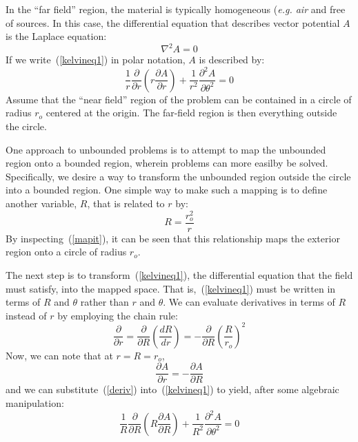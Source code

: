 \documentclass[12pt]{report}
\begin{document}
In the ``far field'' region, the material is typically homogeneous
({\em e.g. air} and free of sources.  In this case, the
differential equation that describes vector potential $A$ is the
Laplace equation:
\begin{equation} \label{kelvineq1}
\nabla^2 A = 0
\end{equation}
If we write~(\ref{kelvineq1}) in polar notation, $A$ is described by:
\begin{equation}
\frac{1}{r} \frac{\partial}{\partial r} \left( r \frac{\partial
A}{\partial r} \right) + \frac{1}{r^2} \frac{\partial^2 A}{\partial
\theta^2} = 0
\end{equation}
Assume that the ``near field'' region of the problem can be
contained in a circle of radius $r_o$ centered at the origin.  The
far-field region is then everything outside the circle.

One approach to unbounded problems is to attempt to map the
unbounded region onto a bounded region, wherein problems can more
easilby be solved.  Specifically, we desire a way to transform the
unbounded region outside the circle into a bounded region.  One
simple way to make such a mapping is to define another variable,
$R$, that is related to $r$ by:
\begin{equation} \label{mapit}
R = \frac{r_o^2}{r}
\end{equation}
By inspecting~(\ref{mapit}), it can be seen that this relationship
maps the exterior region onto a circle of radius $r_o$.


The next step is to transform~(\ref{kelvineq1}), the differential
equation that the field must satisfy, into the mapped space. That
is,~(\ref{kelvineq1}) must be written in terms of $R$ and $\theta$ rather
than $r$ and $\theta$.  We can evaluate derivatives in terms of $R$
instead of $r$ by employing the chain rule:
\begin{equation} \label{deriv}
\frac{\partial}{\partial r} = \frac{\partial}{\partial R} \left(
\frac{d R}{d r} \right) = -\frac{\partial}{\partial R} \left(
\frac{R}{r_o} \right)^2
\end{equation}
Now, we can note that at $r=R=r_o$,
\begin{equation} \label{derivbc}
\frac{\partial A}{\partial r} = -\frac{\partial A}{\partial R}
\end{equation}
and we can substitute~(\ref{deriv}) into~(\ref{kelvineq1}) to yield,
after some algebraic manipulation:
\begin{equation} \label{kelvineq2}
\frac{1}{R} \frac{\partial}{\partial R} \left( R \frac{\partial
A}{\partial R} \right) + \frac{1}{R^2} \frac{\partial^2 A}{\partial
\theta^2} = 0
\end{equation}
\end{document}
